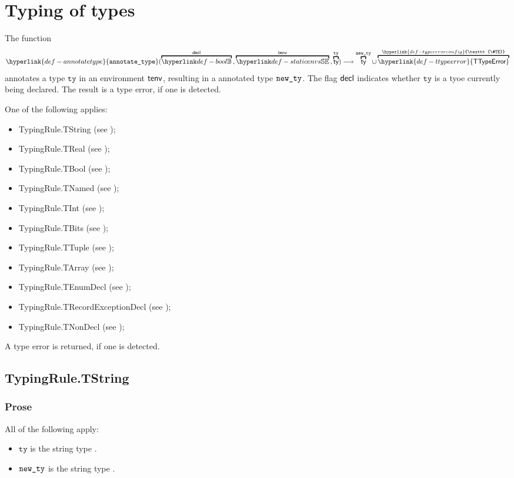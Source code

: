\documentclass{book}
\newcommand\TTypeError[0]{\hyperlink{def-ttypeerror}{\textsf{TTypeError}}}
\newcommand\TypeErrorConfig[0]{\hyperlink{def-typeerrorconfig}{\texttt{\#TE}}}
\newcommand\annotatetype[1]{\hyperlink{def-annotatetype}{\texttt{annotate\_type}}(#1)}
\newcommand\tty[0]{\texttt{ty}}
\begin{document}
\chapter{Typing of types \label{chap:typingoftypes}}
\hypertarget{def-annotatetype}{}
The function
\[
  \annotatetype{\overname{\Bool}{\decl} \aslsep \overname{\staticenvs}{\tenv} \aslsep \overname{\ty}{\tty}}
  \aslto \overname{\ty}{\newty} \cup \overname{\TTypeError}{\TypeErrorConfig}
\]
annotates a type $\tty$ in an environment $\textsf{tenv}$, resulting in a
annotated type $\texttt{new\_ty}$.
The flag $\textsf{decl}$ indicates whether $\tty$ is a tyoe currently being declared.
The result is a type error, if one is detected.

One of the following applies:
\begin{itemize}
  \item TypingRule.TString (see );
  \item TypingRule.TReal (see );
  \item TypingRule.TBool (see );
  \item TypingRule.TNamed (see );
  \item TypingRule.TInt (see );
  \item TypingRule.TBits (see );
  \item TypingRule.TTuple (see );
  \item TypingRule.TArray (see );
  \item TypingRule.TEnumDecl (see );
  \item TypingRule.TRecordExceptionDecl (see
    );
  \item TypingRule.TNonDecl (see );
\end{itemize}
A type error is returned, if one is detected.

\section{TypingRule.TString \label{sec:TypingRule.TString}}

\subsection{Prose}
All of the following apply:
\begin{itemize}
  \item $\tty$ is the string type \TString.
  \item $\texttt{new\_ty}$ is the string type \TString.
\end{itemize}
\end{document}
